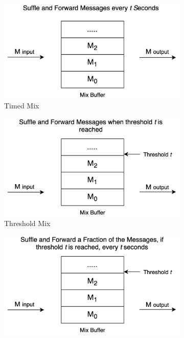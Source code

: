 \documentclass[logo,msc,cyber]{infthesis}   %
\begin{document}
\begin{figure}[h!]
    \centering
    \begin{subfigure}[b]{0.45\textwidth}
        \centering
        \includegraphics[width=\textwidth]{figures/mixing_techniques/timed.png}
        \caption{Timed Mix}
        \label{fig:Timed Mix}
    \end{subfigure}
    \hfill
    \begin{subfigure}[b]{0.45\textwidth}
        \centering
        \includegraphics[width=\textwidth]{figures/mixing_techniques/threshold.png}
        \caption{Threshold Mix}
        \label{fig:Threshold Mix}
    \end{subfigure}
    \hfill
    \begin{subfigure}[b]{0.45\textwidth}
        \centering
        \includegraphics[width=\textwidth]{figures/mixing_techniques/pool.png}

\end{subfigure}
\end{figure}
\end{document}
